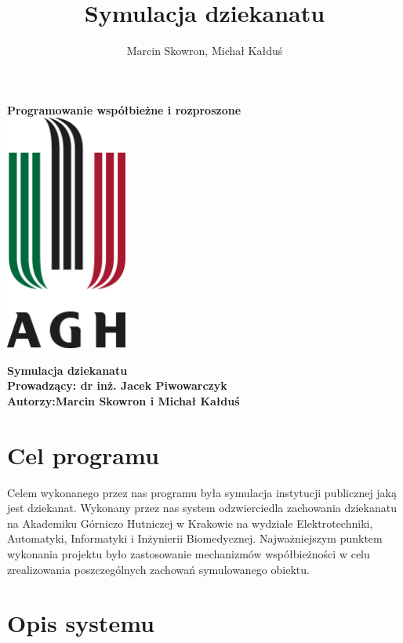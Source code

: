 \documentclass[a4paper,12pt]{article}
\title{Symulacja dziekanatu}
\author{Marcin Skowron, Michał Kałduś}
\begin{document}
\begin{titlepage}
    \centering
    \vfill
    {\bfseries\Large
        Programowanie współbieżne i rozproszone\\

    }    
    \vfill
    \includegraphics[width=4cm]{agh.jpg} 
    \vfill
    
     {\bfseries\Large
     	Symulacja dziekanatu \\ 
     Prowadzący: dr inż. Jacek Piwowarczyk \\
     Autorzy:Marcin Skowron i Michał Kałduś\\
    }  
    \vfill
\end{titlepage}


\tableofcontents

\newpage


\section{Cel programu}
	
Celem wykonanego przez nas programu była symulacja instytucji publicznej jaką jest dziekanat. Wykonany przez nas system odzwierciedla zachowania dziekanatu na Akademiku Górniczo Hutniczej w Krakowie na wydziale Elektrotechniki, Automatyki, Informatyki i Inżynierii Biomedycznej. Najważniejszym punktem wykonania projektu było zastosowanie mechanizmów współbieżności w celu zrealizowania poszczególnych zachowań symulowanego obiektu.











\section{Opis systemu}
\end{document}
